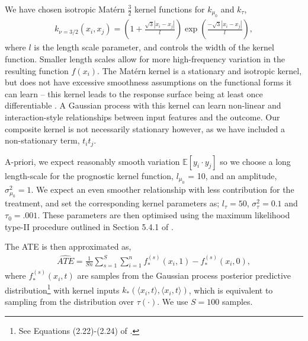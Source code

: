 \documentclass[12pt, a4paper]{article}
\begin{document}
We have chosen isotropic Mat\'{e}rn $\frac{3}{2}$ kernel functions for
$k_{\mu_0}$ and $k_\tau$, 
\begin{align*}
  k_{\nu=3/2}(x_i, x_j) = 
    \left(1 + \frac{\sqrt{3}|x_i - x_j|}{l} \right)
    \exp\left(\frac{-\sqrt{3}|x_i - x_j|}{l}\right),
\end{align*}
where $l$ is the length scale parameter, and controls the width of the kernel
function. Smaller length scales allow for more high-frequency variation in the
resulting function $f(x_i)$. The Mat\'{e}rn kernel is a stationary and
isotropic kernel, but does not have excessive smoothness assumptions on the
functional forms it can learn -- this kernel leads to the response surface
being at least once differentiable \citep{williams2006}. A Gaussian process
with this kernel can learn non-linear and interaction-style relationships
between input features and the outcome. Our composite kernel is not
necessarily stationary however, as we have included a non-stationary term, $t_i
t_j$. 

A-priori, we expect reasonably smooth variation $\mathbb{E}[y_i \cdot y_j]$ so
we choose a long length-scale for the prognostic kernel function, $l_{\mu_0}$ =
10, and an amplitude, $\sigma^2_{\mu_0} = 1$. We expect an even smoother
relationship with less contribution for the treatment, and set the
corresponding kernel parameters as; $l_\tau = 50$, $\sigma^2_\tau = 0.1$ and
$\tau_0 = .001$. These parameters are then optimised using the maximum
likelihood type-II procedure outlined in Section 5.4.1 of \citet{williams2006}.

The ATE is then approximated as,
\begin{align*}
  \hat{ATE} = \frac{1}{Sn} \sum^S_{s=1}\sum^n_{i=1}
    f^{(s)}_*(x_i, 1) - f^{(s)}_*(x_i, 0),
\end{align*}
where $f^{(s)}_*(x_i, t)$ are samples from the Gaussian process posterior
predictive distribution\footnote{See Equations (2.22)-(2.24)
of \citet{williams2006}.} with kernel inputs $k_*(\langle x_i, t \rangle, \langle x_i, t
\rangle)$, which is equivalent to sampling from the distribution over
$\tau(\cdot)$. We use $S=100$ samples.
\end{document}

